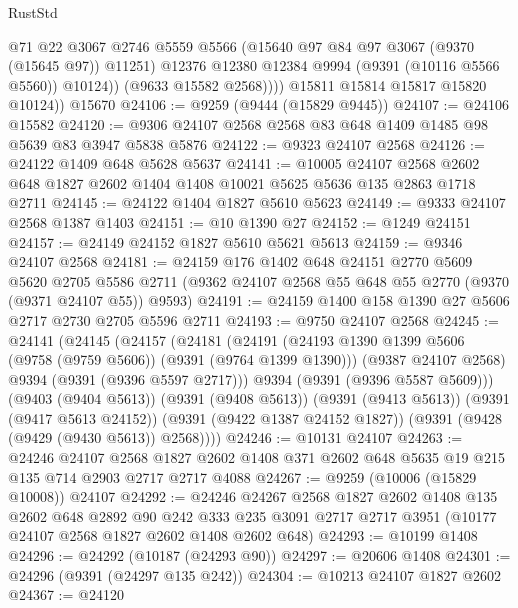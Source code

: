 \begin{lexlean}{RustStd}
\begin{coremodule}
                  @71
                  @22
                  @3067
                  @2746
                  @5559
                  @5566
                  (@15640 @97 @84 @97 @3067 (@9370 (@15645 @97)) @11251)
                  @12376
                  @12380
                  @12384
                  @9994
                  (@9391 (@10116 @5566 @5560))
                  @10124))
              (@9633 @15582 @2568))))
        @15811
        @15814
        @15817
        @15820
        @10124))
    @15670
@24106 := @9259 (@9444 (@15829 @9445))
@24107 := @24106 @15582
@24120 := @9306 @24107 @2568 @2568 @83 @648 @1409 @1485 @98 @5639 @83 @3947 @5838 @5876
@24122 := @9323 @24107 @2568
@24126 := @24122 @1409 @648 @5628 @5637
@24141 := @10005
    @24107
    @2568
    @2602
    @648
    @1827
    @2602
    @1404
    @1408
    @10021
    @5625
    @5636
    @135
    @2863
    @1718
    @2711
@24145 := @24122 @1404 @1827 @5610 @5623
@24149 := @9333 @24107 @2568 @1387 @1403
@24151 := @10 @1390 @27
@24152 := @1249 @24151
@24157 := @24149 @24152 @1827 @5610 @5621 @5613
@24159 := @9346 @24107 @2568
@24181 := @24159
    @176
    @1402
    @648
    @24151
    @2770
    @5609
    @5620
    @2705
    @5586
    @2711
    (@9362 @24107 @2568 @55 @648 @55 @2770 (@9370 (@9371 @24107 @55)) @9593)
@24191 := @24159 @1400 @158 @1390 @27 @5606 @2717 @2730 @2705 @5596 @2711
@24193 := @9750 @24107 @2568
@24245 := @24141
    (@24145
      (@24157
        (@24181
          (@24191
            (@24193 @1390 @1399 @5606 (@9758 (@9759 @5606)) (@9391 (@9764 @1399 @1390)))
            (@9387 @24107 @2568)
            @9394
            (@9391 (@9396 @5597 @2717)))
          @9394
          (@9391 (@9396 @5587 @5609)))
        (@9403 (@9404 @5613))
        (@9391 (@9408 @5613))
        (@9391 (@9413 @5613))
        (@9391 (@9417 @5613 @24152))
        (@9391 (@9422 @1387 @24152 @1827))
        (@9391 (@9428 (@9429 (@9430 @5613)) @2568))))
@24246 := @10131 @24107
@24263 := @24246
    @24107
    @2568
    @1827
    @2602
    @1408
    @371
    @2602
    @648
    @5635
    @19
    @215
    @135
    @714
    @2903
    @2717
    @2717
    @4088
@24267 := @9259 (@10006 (@15829 @10008)) @24107
@24292 := @24246
    @24267
    @2568
    @1827
    @2602
    @1408
    @135
    @2602
    @648
    @2892
    @90
    @242
    @333
    @235
    @3091
    @2717
    @2717
    @3951
    (@10177 @24107 @2568 @1827 @2602 @1408 @2602 @648)
@24293 := @10199 @1408
@24296 := @24292 (@10187 (@24293 @90))
@24297 := @20606 @1408
@24301 := @24296 (@9391 (@24297 @135 @242))
@24304 := @10213 @24107 @1827 @2602
@24367 := @24120

\end{coremodule}
\end{lexlean}
